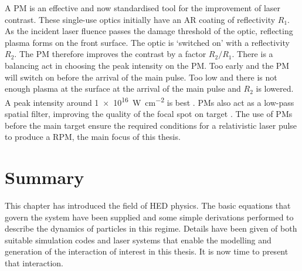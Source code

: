 A \ac{PM} is an effective and now standardised tool for the improvement of laser contrast. These single-use optics initially have an \ac{AR} coating of reflectivity $R_1$. As the incident laser fluence passes the damage threshold of the optic, reflecting plasma forms on the front surface. The optic is `switched on' with a reflectivity $R_2$. The \ac{PM} therefore improves the contrast by a factor $R_2/R_1$. There is a balancing act in choosing the peak intensity on the \ac{PM}. Too early and the PM will switch on before the arrival of the main pulse. Too low and there is not enough plasma at the surface at the arrival of the main pulse and $R_2$ is lowered. A peak intensity around \qty{1e16}{W.cm^{-2}} is best \cite{caiTimeresolvedMeasurementsReflectivity2009}. PMs also act as a low-pass spatial filter, improving the quality of the focal spot on target \cite{doumyCompleteCharacterizationPlasma2004}. The use of PMs before the main target ensure the required conditions for a relativistic laser pulse to produce a \ac{RPM}, the main focus of this thesis.

\section{Summary}
This chapter has introduced the field of HED physics. The basic equations that govern the system have been supplied and some simple derivations performed to describe the dynamics of particles in this regime. Details have been given of both suitable simulation codes and laser systems that enable the modelling and generation of the interaction of interest in this thesis. It is now time to present that interaction.